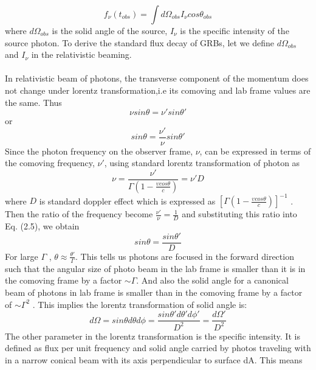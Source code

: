 \begin{equation}
 f_{\nu}(t_{obs})= \int d\Omega_{obs} I_{\nu}cos\theta_{obs}
 \end{equation}
 where  $ d\Omega_{obs}$ is the solid angle of the source, $ I_{\nu} $  is the specific intensity of the source photon. To derive the standard flux decay of GRBs, let we define $ d\Omega_{obs}$   and $ I_{\nu} $ in the relativistic beaming.\\\\ In relativistic beam of photons, the transverse component of the momentum does not change under lorentz transformation,i.e its comoving and lab frame values are the same. Thus
\begin{equation}
\nu sin\theta = \nu'sin\theta'
\end{equation}
or
\begin{equation}
sin\theta =\frac{\nu'}{\nu}sin \theta'
\end{equation}
Since the photon frequency on the observer frame, $ \nu $, can be expressed in terms of the comoving frequency, $ \nu' $, using standard lorentz transformation of photon as
\begin{equation}
\nu =\frac{\nu'}{\Gamma (1 -\frac{\upsilon cos\theta}{c})} =\nu'D
\end{equation}
where $ D $ is standard doppler effect which is expressed as $ [\Gamma (1 -\frac{\upsilon cos\theta}{c} )]^{-1}$ . Then the ratio of the frequency become $ \frac{\nu'}{\nu} = \frac{1}{D}$ and substituting this ratio into Eq. (2.5), we obtain
\begin{equation}
sin\theta = \frac{sin\theta'}{D}
\end{equation}
For large $\Gamma$ , $\theta  \approx \frac{\theta'}{\Gamma}$. This tells us photons are focused in the forward direction
such that the angular size of photo beam in the lab frame is smaller than it is in the comoving frame by a factor $\sim \Gamma $. And also the solid angle for a canonical beam of photons in lab frame is smaller than in the comoving frame by a factor of $\sim \Gamma^{2}$ . This implies the lorentz transformation of solid angle is:
\begin{equation}
d\Omega =sin\theta d\theta d\phi =\frac{sin\theta'd\theta'd\phi'}{D^{2}}= \frac{d\Omega'}{D^{2}}
\end{equation}
The other parameter in the lorentz transformation is the specific intensity. It is
defined as flux per unit frequency and solid angle carried by photos traveling with in a narrow conical beam with its axis perpendicular to surface dA. This means
